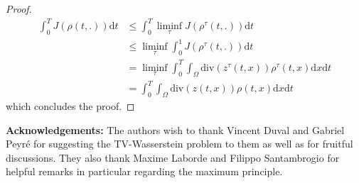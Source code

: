 \documentclass[12pt, a4paper]{article}
\numberwithin{equation}{section}
\theoremstyle{plain}
\theoremstyle{definition}
\theoremstyle{remark}
\newcommand{\dive}{\mathrm{div}}
\begin{document}
\begin{proof}
\[\begin{split}
\int_0^T J(\rho(t,.)) \mbox{d} t & \le \int_0^T  \liminf_{\tau} J(\rho^\tau(t,.)) \mbox{d} t \\
&\le     \liminf_{\tau} \int_0^1  J(\rho^\tau(t,.)) \mbox{d} t   \\
&=  \liminf_{\tau} \int_0^T \int_\Omega \dive( z^\tau(t,x))  \rho^\tau(t,x) \mbox{d} x \mbox{d} t\\
&= \int_0^T \int_\Omega  \dive(z(t,x)) \rho(t,x) \mbox{d} x \mbox{d} t
\end{split}\]
which concludes the proof. 


\end{proof}





\smallskip


{\textbf{Acknowledgements:}} The authors wish to thank Vincent Duval and Gabriel Peyr\'e for suggesting the TV-Wasserstein problem to them as well as for fruitful discussions. They also thank Maxime Laborde and Filippo Santambrogio for helpful remarks in particular regarding the maximum principle.







 
 
 
  
\end{document}
